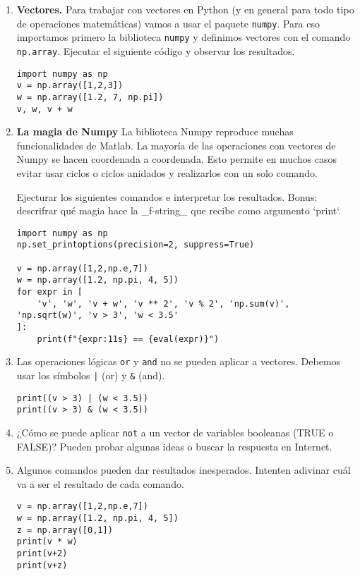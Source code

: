 \documentclass[a4paper,11pt]{article}
\theoremstyle{definition}
\begin{document}
\begin{enumerate}
\item \textbf{Vectores.}
Para trabajar con vectores en Python (y en general para todo tipo de operaciones matemáticas) vamos a usar el paquete \lstinline{numpy}. Para eso importamos primero la biblioteca \lstinline{numpy} y definimos vectores con el comando \lstinline{np.array}. Ejecutar el siguiente c\'odigo y observar los resultados.

\begin{lstlisting}
import numpy as np
v = np.array([1,2,3])
w = np.array([1.2, 7, np.pi])
v, w, v + w
\end{lstlisting}

\item \textbf{La magia de Numpy} La biblioteca Numpy reproduce muchas funcionalidades de Matlab. La mayor\'ia de las operaciones con vectores de Numpy se hacen coordenada a coordenada. Esto permite en muchos casos evitar usar ciclos o ciclos anidados y realizarlos con un solo comando.

Ejecturar los siguientes comandos e interpretar los resultados. Bonus: descrifrar qué magia hace la _f-string_ que recibe como argumento `print`.
\begin{lstlisting}
import numpy as np
np.set_printoptions(precision=2, suppress=True)

v = np.array([1,2,np.e,7])
w = np.array([1.2, np.pi, 4, 5])
for expr in [
    'v', 'w', 'v + w', 'v ** 2', 'v % 2', 'np.sum(v)', 'np.sqrt(w)', 'v > 3', 'w < 3.5'
]:
    print(f"{expr:11s} == {eval(expr)}")
\end{lstlisting}

\item Las operaciones l\'ogicas \lstinline{or} y \lstinline{and} no se pueden aplicar a vectores. Debemos usar los s\'imbolos \lstinline{|} (or) y \lstinline{&} (and).
\begin{lstlisting}
print((v > 3) | (w < 3.5))
print((v > 3) & (w < 3.5))
\end{lstlisting}

\item ¿C\'omo se puede aplicar \lstinline{not} a un vector de variables booleanas (TRUE o FALSE)? Pueden probar algunas ideas o buscar la respuesta en Internet.

\item Algunos comandos pueden dar resultados inesperados. Intenten adivinar cuál va a ser el resultado de cada comando.
\begin{lstlisting}
v = np.array([1,2,np.e,7])
w = np.array([1.2, np.pi, 4, 5])
z = np.array([0,1])
print(v * w)
print(v+2)
print(v+z)
\end{lstlisting}


\end{enumerate}
\end{document}
